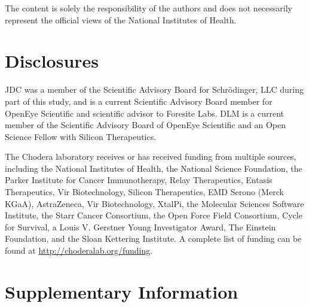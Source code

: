 \documentclass[9pt,lineno,final]{elife}
\newcommand{\beginsupplement}{%
        \setcounter{table}{0}
        \renewcommand{\thetable}{S\arabic{table}}%
        \setcounter{figure}{0}
        \renewcommand{\thefigure}{S\arabic{figure}}%
     }
\begin{document}
The content is solely the responsibility of the authors and does not necessarily represent the official views of the National Institutes of Health.

\section{Disclosures}

JDC was a member of the Scientific Advisory Board for Schr\"{o}dinger, LLC during part of this study, and is a current Scientific Advisory Board member for OpenEye Scientific and scientific advisor to Foresite Labs.
DLM is a current member of the Scientific Advisory Board of OpenEye Scientific and an Open Science Fellow with Silicon Therapeutics.

The Chodera laboratory receives or has received funding from multiple sources, including the National Institutes of Health, the National Science Foundation, the Parker Institute for Cancer Immunotherapy, Relay Therapeutics, Entasis Therapeutics, Vir Biotechnology, Silicon Therapeutics, EMD Serono (Merck KGaA), AstraZeneca, Vir Biotechnology, XtalPi, the Molecular Sciences Software Institute, the Starr Cancer Consortium, the Open Force Field Consortium, Cycle for Survival, a Louis V. Gerstner Young Investigator Award, The Einstein Foundation, and the Sloan Kettering Institute.
A complete list of funding can be found at \url{http://choderalab.org/funding}.






\newpage
\beginsupplement
\section{Supplementary Information}
\end{document}
